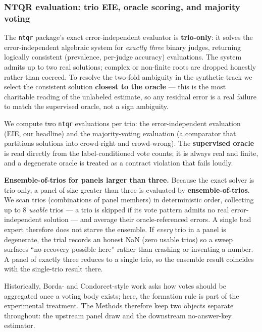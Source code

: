\documentclass[
]{article}
\begin{document}
\subsubsection{NTQR evaluation: trio EIE, oracle scoring, and majority
voting}\label{ntqr-evaluation-trio-eie-oracle-scoring-and-majority-voting}

The \texttt{ntqr} package's exact error-independent evaluator is
\textbf{trio-only}: it solves the error-independent algebraic system for
\emph{exactly three} binary judges, returning logically consistent
(prevalence, per-judge accuracy) evaluations. The system admits up to
two real solutions; complex or non-finite roots are dropped honestly
rather than coerced. To resolve the two-fold ambiguity in the synthetic
track we select the consistent solution \textbf{closest to the oracle}
--- this is the most charitable reading of the unlabeled estimate, so
any residual error is a real failure to match the supervised oracle, not
a sign ambiguity.

We compute two \texttt{ntqr} evaluations per trio: the error-independent
evaluation (EIE, our headline) and the majority-voting evaluation (a
comparator that partitions solutions into crowd-right and crowd-wrong).
The \textbf{supervised oracle} is read directly from the
label-conditioned vote counts; it is always real and finite, and a
degenerate oracle is treated as a contract violation that fails loudly.

\textbf{Ensemble-of-trios for panels larger than three.} Because the
exact solver is trio-only, a panel of size greater than three is
evaluated by \textbf{ensemble-of-trios}. We scan trios (combinations of
panel members) in deterministic order, collecting up to 8 \emph{usable}
trios --- a trio is skipped if its vote pattern admits no real
error-independent solution --- and average their oracle-referenced
errors. A single bad expert therefore does not starve the ensemble. If
\emph{every} trio in a panel is degenerate, the trial records an honest
NaN (zero usable trios) so a sweep surfaces ``no recovery possible
here'' rather than crashing or inventing a number. A panel of exactly
three reduces to a single trio, so the ensemble result coincides with
the single-trio result there.

Historically, Borda- and Condorcet-style work asks how votes should be
aggregated once a voting body exists; here, the formation rule is part
of the experimental treatment. The Methods therefore keep two objects
separate throughout: the upstream panel draw and the downstream
no-answer-key estimator.
\end{document}

